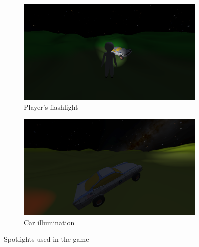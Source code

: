 \begin{figure}[!htb]
    \centering
    \begin{subfigure}[b]{0.475\textwidth}
        \centering
        \includegraphics[width=\textwidth]{chapters/theoretical_foundations/sections/lighting/resources/player-flashlight.png}
        \caption[]%
        {{\small Player's flashlight}}
        \label{fig:spotlight-player}
    \end{subfigure}
    \hfill
    \begin{subfigure}[b]{0.475\textwidth}
        \centering
        \includegraphics[width=\textwidth]{chapters/theoretical_foundations/sections/lighting/resources/car-lights-spot.png}
        \caption[]%
        {{\small Car illumination}}
        \label{fig:spotlight-car}
    \end{subfigure}
    \caption[]
    {\small Spotlights used in the game}
    \label{fig:spotlights}
\end{figure}